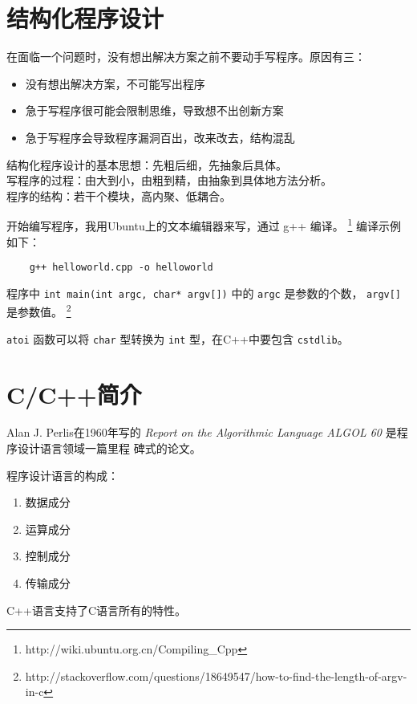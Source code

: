 \documentclass[UTF8]{ctexart}
\begin{document}
\section{结构化程序设计}
在面临一个问题时，没有想出解决方案之前不要动手写程序。原因有三：
\begin{itemize}
    \item 没有想出解决方案，不可能写出程序
    \item 急于写程序很可能会限制思维，导致想不出创新方案
    \item 急于写程序会导致程序漏洞百出，改来改去，结构混乱
\end{itemize}

结构化程序设计的基本思想：先粗后细，先抽象后具体。\\
写程序的过程：由大到小，由粗到精，由抽象到具体地方法分析。\\
程序的结构：若干个模块，高内聚、低耦合。

开始编写程序，我用Ubuntu上的文本编辑器来写，通过 g++ 编译。
\footnote{http://wiki.ubuntu.org.cn/Compiling\_Cpp} 编译示例如下：
\begin{verbatim}
    g++ helloworld.cpp -o helloworld
\end{verbatim}

程序中 \texttt{int main(int argc, char* argv[])} 中的 \texttt{argc} 是参数的个数，
\texttt{argv[]} 是参数值。
\footnote{http://stackoverflow.com/questions/18649547/how-to-find-the-length-of-argv-in-c}

\texttt{atoi} 函数可以将 \texttt{char} 型转换为 \texttt{int} 型，在C++中要包含 \texttt{cstdlib}。

\section{C/C++简介}
Alan J. Perlis在1960年写的 \emph{Report on the Algorithmic Language ALGOL 60} 是程序设计语言领域一篇里程
碑式的论文。

程序设计语言的构成：
\begin{enumerate}
    \item 数据成分
    \item 运算成分
    \item 控制成分
    \item 传输成分
\end{enumerate}

C++语言支持了C语言所有的特性。
\end{document}
